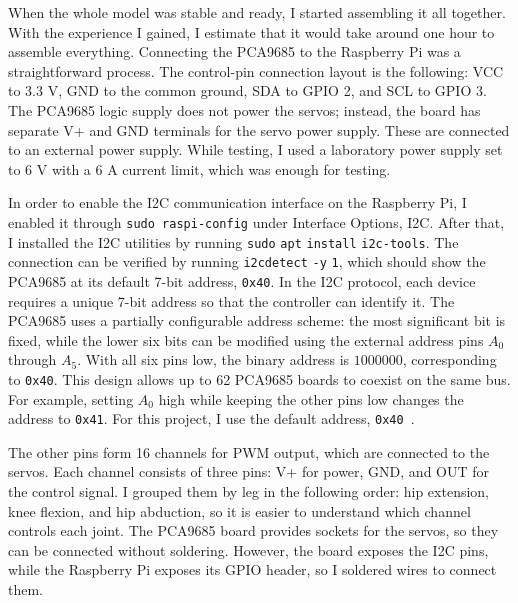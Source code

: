 \documentclass[a4paper,12pt]{report}
\begin{document}
When the whole model was stable and ready, I started assembling it all together. With the
experience I gained, I estimate that it would take around one hour to assemble everything.
Connecting the PCA9685 to the Raspberry Pi was a straightforward process. The control-pin
connection layout is the following: VCC to 3.3 V, GND to the common ground, SDA to GPIO 2, and SCL
to GPIO 3. The PCA9685 logic supply does not power the servos; instead, the board has separate V+
and GND terminals for the servo power supply. These are connected to an external power supply.
While testing, I used a laboratory power supply set to 6 V with a 6 A current limit, which was
enough for testing.

In order to enable the I2C communication interface on the Raspberry Pi, I enabled it through
\texttt{sudo raspi-config} under Interface Options, I2C. After that, I installed the I2C utilities
by running \texttt{sudo} \texttt{apt} \texttt{install} \texttt{i2c-tools}. The connection can be
verified by running \texttt{i2cdetect} \texttt{-y} \texttt{1}, which should show the PCA9685 at
its default 7-bit address,
\texttt{0x40}. In the I2C protocol, each device requires a unique 7-bit address so that the
controller can identify it. The PCA9685 uses a partially configurable address scheme: the most
significant bit is fixed, while the lower six bits can be modified using the external address pins
$A_0$ through $A_5$. With all six pins low, the binary address is $1000000$, corresponding to
\texttt{0x40}. This design allows up to 62 PCA9685 boards to coexist on the same bus. For example,
setting $A_0$ high while keeping the other pins low changes the address to \texttt{0x41}. For this
project, I use the default address, \texttt{0x40}~\parencite{pca9685}.

The other pins form 16 channels for PWM output, which are connected to the servos. Each channel
consists of three pins: V+ for power, GND, and OUT for the control signal. I grouped them by leg in
the following order: hip extension, knee flexion, and hip abduction, so it is easier to understand
which channel controls each joint. The PCA9685 board provides sockets for the servos, so they can be
connected without soldering. However, the board exposes the I2C pins, while the Raspberry Pi exposes
its GPIO header, so I soldered wires to connect them.
\end{document}
